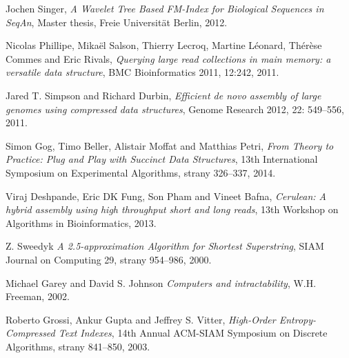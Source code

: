 \begin{thebibliography}{99}
        Jochen Singer,
        \emph{A Wavelet Tree Based FM-Index for Biological Sequences in SeqAn},
        Master thesis,
        Freie Universit\"{a}t Berlin,
        2012.
        
        Nicolas Phillipe, Mika\"{e}l Salson, Thierry Lecroq, Martine Léonard, Thér\`{e}se Commes and Eric Rivals,
        \emph{Querying large read collections in main memory: a versatile data structure},
        BMC Bioinformatics 2011, 12:242,
        2011.
        
        Jared T. Simpson and Richard Durbin,
        \emph{Efficient de novo assembly of large genomes using compressed data structures},
        Genome Research 2012, 22: 549--556,
        2011.
        
        Simon Gog, Timo Beller, Alistair Moffat and Matthias Petri,
        \emph{From Theory to Practice: Plug and Play with Succinct Data Structures},
        13th International Symposium on Experimental Algorithms, strany 326--337,
        2014.
        
        Viraj Deshpande, Eric DK Fung, Son Pham and Vineet Bafna,
        \emph{Cerulean: A hybrid assembly using high
throughput short and long reads},
        13th Workshop on Algorithms in Bioinformatics,
        2013.
        
        Z. Sweedyk
        \emph{A 2.5-approximation Algorithm for Shortest Superstring},
        SIAM Journal on Computing 29, strany 954--986,
        2000.

        Michael Garey and David S. Johnson    
        \emph{Computers and intractability},
        W.H. Freeman,
        2002.
        
        Roberto Grossi, Ankur Gupta and Jeffrey S. Vitter,
        \emph{High-Order Entropy-Compressed Text Indexes},
        14th Annual ACM-SIAM Symposium on Discrete Algorithms, strany 841--850,
        2003.        
    
\end{thebibliography}